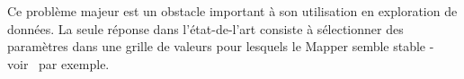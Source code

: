 
Ce probl\`eme majeur est un obstacle important \`a son utilisation en exploration de donn\'ees.
La seule r\'eponse dans l'\'etat-de-l'art consiste \`a s\'electionner des param\`etres dans une grille de valeurs
pour lesquels le Mapper semble stable - voir~\cite{Nielson15} par exemple.


